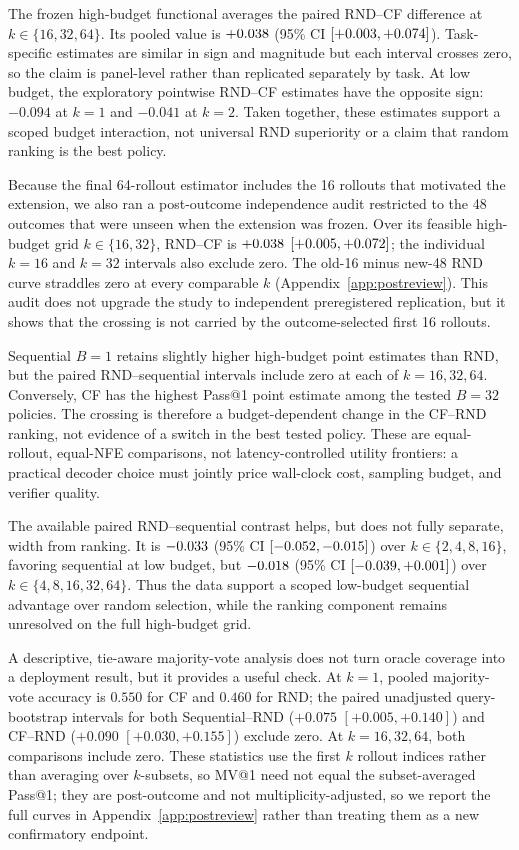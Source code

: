 \documentclass[11pt]{article}
\begin{document}
The frozen high-budget functional averages the paired RND--CF difference at $k\in\{16,32,64\}$. Its pooled value is $+0.038$ (95\% CI $[+0.003,+0.074]$). Task-specific estimates are similar in sign and magnitude but each interval crosses zero, so the claim is panel-level rather than replicated separately by task. At low budget, the exploratory pointwise RND--CF estimates have the opposite sign: $-0.094$ at $k=1$ and $-0.041$ at $k=2$. Taken together, these estimates support a scoped budget interaction, not universal RND superiority or a claim that random ranking is the best policy.

Because the final 64-rollout estimator includes the 16 rollouts that motivated the extension, we also ran a post-outcome independence audit restricted to the 48 outcomes that were unseen when the extension was frozen. Over its feasible high-budget grid $k\in\{16,32\}$, RND--CF is $+0.038$ $[+0.005,+0.072]$; the individual $k=16$ and $k=32$ intervals also exclude zero. The old-16 minus new-48 RND curve straddles zero at every comparable $k$ (Appendix~\ref{app:postreview}). This audit does not upgrade the study to independent preregistered replication, but it shows that the crossing is not carried by the outcome-selected first 16 rollouts.

Sequential $B=1$ retains slightly higher high-budget point estimates than RND, but the paired RND--sequential intervals include zero at each of $k=16,32,64$. Conversely, CF has the highest Pass@1 point estimate among the tested $B=32$ policies. The crossing is therefore a budget-dependent change in the CF--RND ranking, not evidence of a switch in the best tested policy. These are equal-rollout, equal-NFE comparisons, not latency-controlled utility frontiers: a practical decoder choice must jointly price wall-clock cost, sampling budget, and verifier quality.

The available paired RND--sequential contrast helps, but does not fully separate, width from ranking. It is $-0.033$ (95\% CI $[-0.052,-0.015]$) over $k\in\{2,4,8,16\}$, favoring sequential at low budget, but $-0.018$ (95\% CI $[-0.039,+0.001]$) over $k\in\{4,8,16,32,64\}$. Thus the data support a scoped low-budget sequential advantage over random selection, while the ranking component remains unresolved on the full high-budget grid.

A descriptive, tie-aware majority-vote analysis does not turn oracle coverage into a deployment result, but it provides a useful check. At $k=1$, pooled majority-vote accuracy is $0.550$ for CF and $0.460$ for RND; the paired unadjusted query-bootstrap intervals for both Sequential--RND ($+0.075$ $[+0.005,+0.140]$) and CF--RND ($+0.090$ $[+0.030,+0.155]$) exclude zero. At $k=16,32,64$, both comparisons include zero. These statistics use the first $k$ rollout indices rather than averaging over $k$-subsets, so MV@1 need not equal the subset-averaged Pass@1; they are post-outcome and not multiplicity-adjusted, so we report the full curves in Appendix~\ref{app:postreview} rather than treating them as a new confirmatory endpoint.
\end{document}
